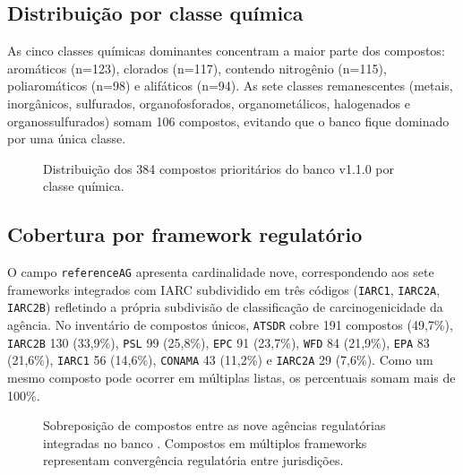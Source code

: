 \subsection{Distribuição por classe química}

As cinco classes químicas dominantes concentram a maior parte dos compostos: aromáticos (n=123), clorados (n=117), contendo nitrogênio (n=115), poliaromáticos (n=98) e alifáticos (n=94). As sete classes remanescentes (metais, inorgânicos, sulfurados, organofosforados, organometálicos, halogenados e organossulfurados) somam 106 compostos, evitando que o banco fique dominado por uma única classe.

\begin{figure}[htbp]
\centering
{}
\caption{Distribuição dos 384 compostos prioritários do banco \biorempp{} v1.1.0 por classe química.}
\label{fig:c1-classes}
\end{figure}

\subsection{Cobertura por framework regulatório}

O campo \texttt{referenceAG} apresenta cardinalidade nove, correspondendo aos sete frameworks integrados com IARC subdividido em três códigos (\texttt{IARC1}, \texttt{IARC2A}, \texttt{IARC2B}) refletindo a própria subdivisão de classificação de carcinogenicidade da agência. No inventário de compostos únicos, \texttt{ATSDR} cobre 191 compostos (49,7\%), \texttt{IARC2B} 130 (33,9\%), \texttt{PSL} 99 (25,8\%), \texttt{EPC} 91 (23,7\%), \texttt{WFD} 84 (21,9\%), \texttt{EPA} 83 (21,6\%), \texttt{IARC1} 56 (14,6\%), \texttt{CONAMA} 43 (11,2\%) e \texttt{IARC2A} 29 (7,6\%). Como um mesmo composto pode ocorrer em múltiplas listas, os percentuais somam mais de 100\%.

\begin{figure}[htbp]
\centering
{}
\caption{Sobreposição de compostos entre as nove agências regulatórias integradas no banco \biorempp{}. Compostos em múltiplos frameworks representam convergência regulatória entre jurisdições.}
\label{fig:c1-agencias}
\end{figure}

